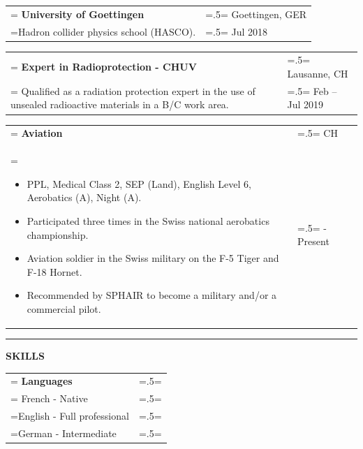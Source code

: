 \documentclass[letterpaper, 11pt]{article}
\begin{document}
\begin{tabularx}{1.0\textwidth} { 
   >{\raggedright\arraybackslash\hsize=1.5\hsize\linewidth=\hsize}X 
   >{\raggedleft\arraybackslash\hsize=.5\hsize\linewidth=\hsize}X }
\normalsize
\bf{University of Goettingen} & Goettingen, GER \\
\normalfont Hadron collider physics school (HASCO). & Jul 2018 \\
\end{tabularx}
\vspace{0.25cm}

\begin{tabularx}{1.0\textwidth} { 
   >{\raggedright\arraybackslash\hsize=1.5\hsize\linewidth=\hsize}X 
   >{\raggedleft\arraybackslash\hsize=.5\hsize\linewidth=\hsize}X }
\normalsize
\bf{Expert in Radioprotection - CHUV} & Lausanne, CH\\
\normalfont 
Qualified as a radiation protection expert in the use of unsealed radioactive materials in a B/C work area. & Feb -- Jul 2019
\end{tabularx}
\vspace{0.25cm}

\begin{tabularx}{1.0\textwidth} { 
   >{\raggedright\arraybackslash\hsize=1.5\hsize\linewidth=\hsize}X 
   >{\raggedleft\arraybackslash\hsize=.5\hsize\linewidth=\hsize}X }
\normalsize
\bf{Aviation} & CH\\
\normalfont \begin{itemize}[leftmargin=*,noitemsep,topsep=0pt]
\item PPL, Medical Class 2, SEP (Land), English Level 6, Aerobatics (A), Night (A).
\item Participated three times in the Swiss national aerobatics championship.
\item Aviation soldier in the Swiss military on the F-5 Tiger and F-18 Hornet.
\item Recommended by SPHAIR to become a military and/or a commercial pilot.
\end{itemize} & 2014 - Present
\end{tabularx}


\begin{center}
\noindent\rule{0.75\textwidth}{1pt}
\end{center}

\begin{center}
\large\bf{SKILLS}
\end{center}

\begin{tabularx}{1.0\textwidth} { 
   >{\raggedright\arraybackslash\hsize=1.5\hsize\linewidth=\hsize}X 
   >{\raggedleft\arraybackslash\hsize=.5\hsize\linewidth=\hsize}X }
\normalsize
\bf{Languages} & \\
\normalfont
French - Native & \\
English - Full professional & \\
German - Intermediate 
\end{tabularx}
\vspace{0.25cm}
\end{document}
